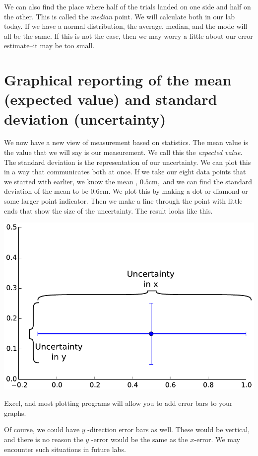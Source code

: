 \documentclass[twoside,11pt,ShortChapTitles]{BYUTextbook}
\begin{document}
We can also find the place where half of the trials landed on one side and
half on the other. This is called the \emph{median} point. We will calculate
both in our lab today. If we have a normal distribution, the average,
median, and the mode will all be the same. If this is not the case, then we
may worry a little about our error estimate--it may be too small.

\section{Graphical reporting of the mean (expected value) and standard
deviation (uncertainty)}

We now have a new view of measurement based on statistics. The mean value is
the value that we will say is our measurement. We call this the \emph{%
expected value}. The standard deviation is the representation of our
uncertainty. We can plot this in a way that communicates both at once. If we
take our eight data points that we started with earlier, we know the mean , $%
0.5\text{cm},$ and we can find the standard deviation of the mean to be $0.6%
\text{cm}.$ We plot this by making a dot or diamond or some larger point
indicator. Then we make a line through the point with little ends that show
the size of the uncertainty. The result looks like this.

\begin{center}
\includegraphics[scale=0.6]{Lab2_figs/error_bars.pdf}
\end{center}

 Excel, and most plotting programs will allow you to
add error bars to your graphs.

Of course, we could have $y$
-direction error bars as well. These would be vertical, and there is no reason the $y$%
-error would be the same as the $x$-error. We may encounter such situations
in future labs.
\end{document}
